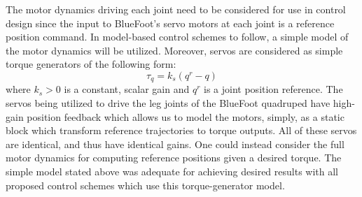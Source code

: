 			The motor dynamics driving each joint need to be considered for use in control design since the input to BlueFoot's servo motors at each joint is a reference position command. In model-based control schemes to follow, a simple model of the motor dynamics will be utilized. Moreover, servos are considered as simple torque generators of the following form:
				\begin{equation}
					\tau_{q} = k_{s}(q^{r}-q)
					\label{eq::servo_control_dynamics}
				\end{equation}
			where $k_{s}>0$ is a constant, scalar gain and $q^{r}$ is a joint position reference. The servos being utilized to drive the leg joints of the BlueFoot quadruped have high-gain position feedback which allows us to model the motors, simply, as a static block which transform reference trajectories to torque outputs. All of these servos are identical, and thus have identical gains. One could instead consider the full motor dynamics for computing reference positions given a desired torque. The simple model stated above was adequate for achieving desired results with all proposed control schemes which use this torque-generator model.


			



